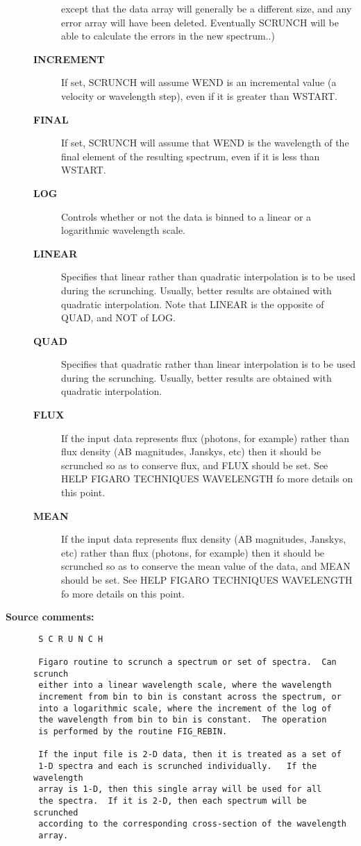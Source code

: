 \begin{description}
\begin{description}
 except that the data array will generally be a different
 size, and any error array will have been deleted.
 Eventually SCRUNCH will be able to calculate the errors
 in the new spectrum..)
\item [{\bf INCREMENT}]
 If set, SCRUNCH will assume WEND is an incremental value
 (a velocity or wavelength step), even if it is greater
 than WSTART.
\item [{\bf FINAL}]
 If set, SCRUNCH will assume that WEND is the wavelength
 of the final element of the resulting spectrum, even if
 it is less than WSTART.
\item [{\bf LOG}]
 Controls whether or not the data is binned to a linear
 or a logarithmic wavelength scale.
\item [{\bf LINEAR}]
 Specifies that linear rather than quadratic
 interpolation is to be used during the scrunching.  Usually,
 better results are obtained with quadratic interpolation.
 Note that LINEAR is the opposite of QUAD, and NOT of LOG.
\item [{\bf QUAD}]
 Specifies that quadratic rather than linear
 interpolation is to be used during the scrunching.  Usually,
 better results are obtained with quadratic interpolation.
\item [{\bf FLUX}]
 If the input data represents flux (photons, for example)
 rather than flux density (AB magnitudes, Janskys, etc)
 then it should be scrunched so as to conserve flux, and
 FLUX should be set.  See HELP FIGARO TECHNIQUES
 WAVELENGTH fo more details on this point.
\item [{\bf MEAN}]
 If the input data represents flux density (AB magnitudes,
 Janskys, etc) rather than flux (photons, for example)
 then it should be scrunched so as to conserve the mean
 value of the data, and MEAN should be set.  See HELP
 FIGARO TECHNIQUES WAVELENGTH fo more details on this point.
\end{description}

\item [{\bf Source comments:}]
\begin{verbatim}
 S C R U N C H

 Figaro routine to scrunch a spectrum or set of spectra.  Can scrunch
 either into a linear wavelength scale, where the wavelength
 increment from bin to bin is constant across the spectrum, or
 into a logarithmic scale, where the increment of the log of
 the wavelength from bin to bin is constant.  The operation
 is performed by the routine FIG_REBIN.

 If the input file is 2-D data, then it is treated as a set of
 1-D spectra and each is scrunched individually.   If the wavelength
 array is 1-D, then this single array will be used for all
 the spectra.  If it is 2-D, then each spectrum will be scrunched
 according to the corresponding cross-section of the wavelength
 array.


\end{verbatim}
\end{description}
